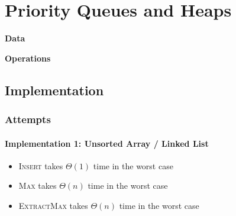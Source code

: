 \chapter{Priority Queues and Heaps}

\begin{minipage}[t]{0.45\linewidth}
    \textbf{Data}
    
\end{minipage}
\begin{minipage}[t]{0.45\linewidth}
    \textbf{Operations}
    
\end{minipage}

\section{Implementation}

\subsection{Attempts}

\subsubsection{Implementation 1: Unsorted Array / Linked List}

\begin{itemize}
    \item \textsc{Insert} takes $\Theta(1)$ time in the worst case 
    \item \textsc{Max} takes $\Theta(n)$ time in the worst case 
    \item \textsc{ExtractMax} takes $\Theta(n)$ time in the worst case
\end{itemize}


